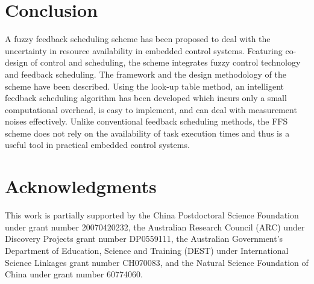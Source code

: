 \documentclass[12pt,a4paper]{ijicic}
\begin{document}
\section{Conclusion}
\label{sec:6}

A fuzzy feedback scheduling scheme has been proposed to deal with
the uncertainty in resource availability in embedded control
systems. Featuring co-design of control and scheduling, the scheme
integrates fuzzy control technology and feedback scheduling. The
framework and the design methodology of the scheme have been
described. Using the look-up table method, an intelligent feedback
scheduling algorithm has been developed which incurs only a small
computational overhead, is easy to implement, and can deal with
measurement noises effectively. Unlike conventional feedback
scheduling methods, the FFS scheme does not rely on the availability
of task execution times and thus is a useful tool in practical
embedded control systems.

\section*{Acknowledgments}
This work is partially supported by the China Postdoctoral Science
Foundation under grant number 20070420232, the Australian Research
Council (ARC) under Discovery Projects grant number DP0559111, the
Australian Government's Department of Education, Science and
Training (DEST) under International Science Linkages grant number
CH070083, and the Natural Science Foundation of China under grant
number 60774060.
\end{document}
